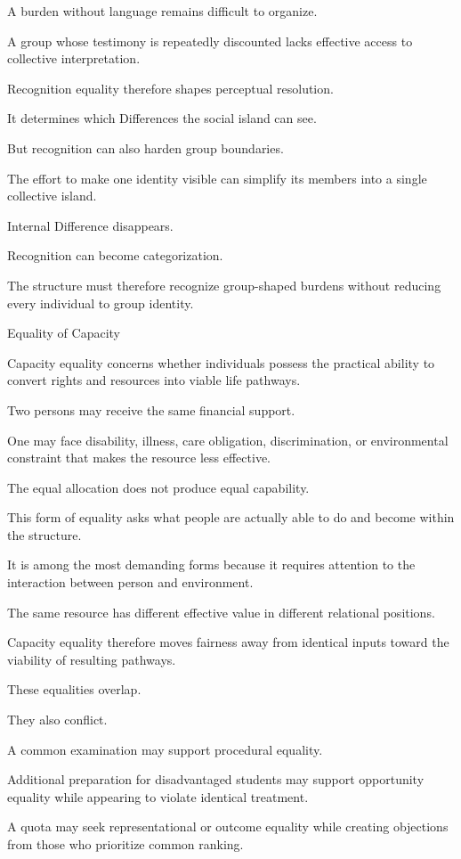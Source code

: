 A burden without language remains difficult to organize.

A group whose testimony is repeatedly discounted lacks effective access to collective interpretation.

Recognition equality therefore shapes perceptual resolution.

It determines which Differences the social island can see.

But recognition can also harden group boundaries.

The effort to make one identity visible can simplify its members into a single collective island.

Internal Difference disappears.

Recognition can become categorization.

The structure must therefore recognize group-shaped burdens without reducing every individual to group identity.

Equality of Capacity

Capacity equality concerns whether individuals possess the practical ability to convert rights and resources into viable life pathways.

Two persons may receive the same financial support.

One may face disability, illness, care obligation, discrimination, or environmental constraint that makes the resource less effective.

The equal allocation does not produce equal capability.

This form of equality asks what people are actually able to do and become within the structure.

It is among the most demanding forms because it requires attention to the interaction between person and environment.

The same resource has different effective value in different relational positions.

Capacity equality therefore moves fairness away from identical inputs toward the viability of resulting pathways.

These equalities overlap.

They also conflict.

A common examination may support procedural equality.

Additional preparation for disadvantaged students may support opportunity equality while appearing to violate identical treatment.

A quota may seek representational or outcome equality while creating objections from those who prioritize common ranking.

